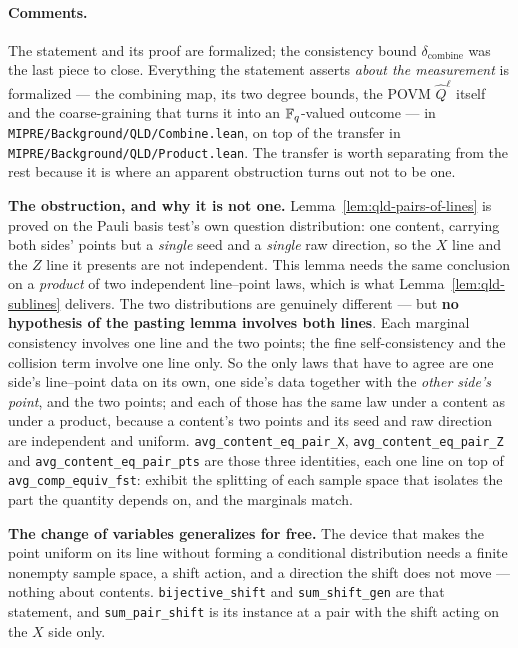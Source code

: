 \paragraph{Comments.} The statement and its proof are formalized; the consistency bound
$\delta_{\mathrm{combine}}$ was the last piece to close. Everything the statement asserts \emph{about the measurement} is formalized ---
the combining map, its two degree bounds, the POVM $\widehat Q^\ell$ itself and the
coarse-graining that turns it into an $\mathbb{F}_q$-valued outcome --- in
\texttt{MIPRE/Background/QLD/Combine.lean}, on top of the transfer in
\texttt{MIPRE/Background/QLD/Product.lean}. The transfer is worth separating from the rest because it
is where an apparent obstruction turns out not to be one.

\textbf{The obstruction, and why it is not one.} Lemma~\ref{lem:qld-pairs-of-lines} is proved on the
Pauli basis test's own question distribution: one content, carrying both sides' points but a
\emph{single} seed and a \emph{single} raw direction, so the $X$ line and the $Z$ line it presents
are not independent. This lemma needs the same conclusion on a \emph{product} of two independent
line--point laws, which is what Lemma~\ref{lem:qld-sublines} delivers. The two distributions are
genuinely different --- but \textbf{no hypothesis of the pasting lemma involves both lines}. Each
marginal consistency involves one line and the two points; the fine self-consistency and the
collision term involve one line only. So the only laws that have to agree are one side's line--point
data on its own, one side's data together with the \emph{other side's point}, and the two points; and
each of those has the same law under a content as under a product, because a content's two points and
its seed and raw direction are independent and uniform. \texttt{avg\_content\_eq\_pair\_X},
\texttt{avg\_content\_eq\_pair\_Z} and \texttt{avg\_content\_eq\_pair\_pts} are those three
identities, each one line on top of \texttt{avg\_comp\_equiv\_fst}: exhibit the splitting of each
sample space that isolates the part the quantity depends on, and the marginals match.

\textbf{The change of variables generalizes for free.} The device that makes the point uniform on its
line without forming a conditional distribution needs a finite nonempty sample space, a shift action,
and a direction the shift does not move --- nothing about contents. \texttt{bijective\_shift} and
\texttt{sum\_shift\_gen} are that statement, and \texttt{sum\_pair\_shift} is its instance at a pair
with the shift acting on the $X$ side only.

